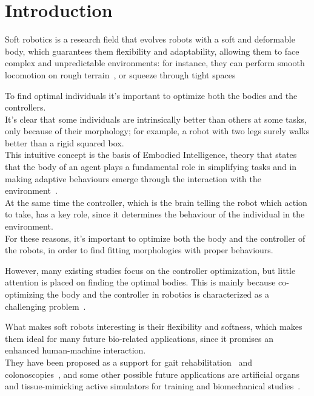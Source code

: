 \chapter{Introduction}
\label{cha:chapter1}

Soft robotics is a research field that evolves robots with a soft and deformable body, which guarantees them flexibility and adaptability, allowing them to face complex and unpredictable environments: for instance, they can perform smooth locomotion on rough terrain~\cite{8460667}, or squeeze through tight spaces~\cite{10.1145/2739480.2754662}

To find optimal individuals it's important to optimize both the bodies and the controllers.\\
It's clear that some individuals are intrinsically better than others at some tasks, only because of their morphology; for example, a robot with two legs surely walks better than a rigid squared box.\\
This intuitive concept is the basis of Embodied Intelligence, theory that states that the body of an agent plays a fundamental role in simplifying tasks and in making adaptive behaviours emerge through the interaction with the environment~\cite{Cianchetti2021}.\\
At the same time the controller, which is the brain telling the robot which action to take, has a key role, since it determines the behaviour of the individual in the environment.\\
For these reasons, it's important to optimize both the body and the controller of the robots, in order to find fitting morphologies with proper behaviours.

However, many existing studies focus on the controller optimization, but little attention is placed on finding the optimal bodies.
This is mainly because co-optimizing the body and the controller in robotics is characterized as a challenging problem~\cite{bhatia2021evolution}.

What makes soft robots interesting is their flexibility and softness, which makes them ideal for many future bio-related applications, since it promises an enhanced human-machine interaction.\\
They have been proposed as a support for gait rehabilitation~\cite{6696468} and colonoscopies~\cite{Zhang2019-fm}, and some other possible future applications are artificial organs and tissue-mimicking active simulators for training and biomechanical studies~\cite{Cianchetti2018}.

